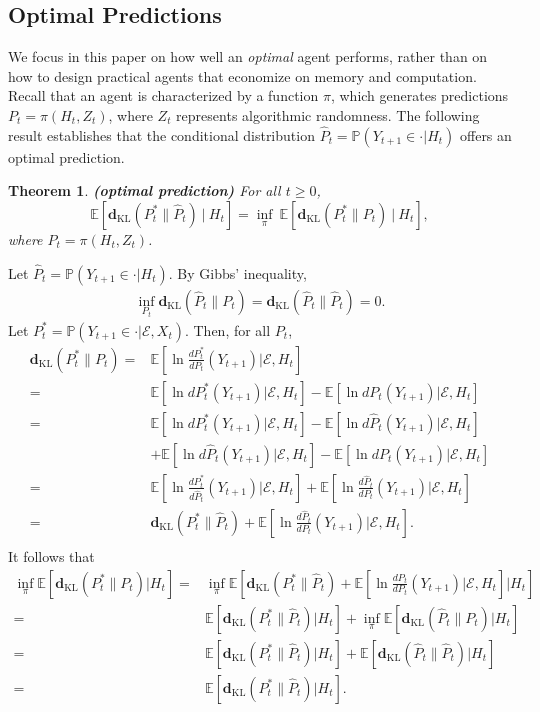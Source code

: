 \documentclass[twoside,11pt]{article}
\renewenvironment{proof}{\par\noindent{\bf Proof\ }}{\hfill\BlackBox\\[2mm]}
\newenvironment{proof}{\par\noindent{\bf Proof\ }}{\hfill\BlackBox\\[2mm]}
\newtheorem{theorem}{Theorem}
\def\environment{\mathcal{E}}
\def\KL{\mathbf{d}_{\mathrm{KL}}}
\def\E{\mathbb{E}}
\def\Pr{\mathbb{P}}
\begin{document}
\subsection{Optimal Predictions}

We focus in this paper on how well an {\it optimal} agent performs, rather than on how to design practical agents that economize on memory and computation.  Recall that an agent is characterized by a function $\pi$, which generates predictions $P_t = \pi(H_t, Z_t)$, where $Z_t$ represents algorithmic randomness.  The following result establishes that the conditional distribution $\hat{P}_t = \Pr(Y_{t+1} \in \cdot |H_t)$ offers an optimal prediction.
\begin{theorem}{\bf (optimal prediction)}
\label{th:opt_prediction}
For all $t \geq 0$,
$$\E[\KL(P^*_t \| \hat{P}_t)\ |\ H_t] = \inf_\pi\ \E[\KL(P^*_t \| P_t)\ |\ H_t],$$
where $P_t= \pi(H_t, Z_t)$.
\end{theorem}
\begin{proof}
    Let $\hat{P}_t = \Pr(Y_{t+1}\in\cdot|H_t)$.  By Gibbs' inequality,
    \begin{align*}
        \inf_{P_t} \KL(\hat{P}_t \| P_t) = \KL(\hat{P}_t \| \hat{P}_t) = 0.
    \end{align*}
    Let $P^*_t = \Pr(Y_{t+1} \in \cdot | \environment, X_t)$.  Then, for all $P_t$,
    \begin{align*}
        \KL(P^*_t \| P_t)
        =& \E\left[ \ln\frac{d P^*_t}{d P_t}(Y_{t+1}) \Big|\environment, H_t\right] \\
        =& \E\left[ \ln dP^*_t (Y_{t+1}) |\environment, H_t\right] - \E\left[ \ln d P_t(Y_{t+1}) |\environment, H_t\right] \\
        =& \E\left[ \ln dP^*_t (Y_{t+1}) |\environment, H_t\right] - \E\left[ \ln d \hat{P}_t(Y_{t+1}) |\environment, H_t\right] \\
        &+ \E\left[ \ln d \hat{P}_t(Y_{t+1}) |\environment, H_t\right] - \E\left[ \ln d P_t(Y_{t+1}) |\environment, H_t\right] \\
        =& \E\left[ \ln\frac{d P^*_t}{d \hat{P}_t}(Y_{t+1}) \Big|\environment, H_t\right] + \E\left[ \ln\frac{d \hat{P}_t}{d P_t}(Y_{t+1}) \Big|\environment, H_t\right] \\
        =& \KL(P^*_t\|\hat{P}_t) + \E\left[ \ln\frac{d \hat{P}_t}{d P_t}(Y_{t+1}) \Big|\environment, H_t\right].\\
    \end{align*}
    It follows that
    \begin{align*}
        \inf_\pi \E[\KL(P^*_t \| P_t) | H_t]
        =& \inf_\pi \E\left[\KL(P^*_t\|\hat{P}_t) + \E\left[ \ln\frac{d \hat{P}_t}{d P_t}(Y_{t+1}) \Big|\environment, H_t\right] \Big| H_t\right] \\
        =& \E[\KL(P^*_t \| \hat{P}_t)| H_t] + \inf_\pi \E[\KL(\hat{P}_t \| P_t) |H_t]\\
        =& \E[\KL(P^*_t \| \hat{P}_t)| H_t] + \E[\KL(\hat{P}_t \| \hat{P}_t) |H_t]\\
        =& \E[\KL(P^*_t \| \hat{P}_t)| H_t].
    \end{align*}
\end{proof}
\end{document}
